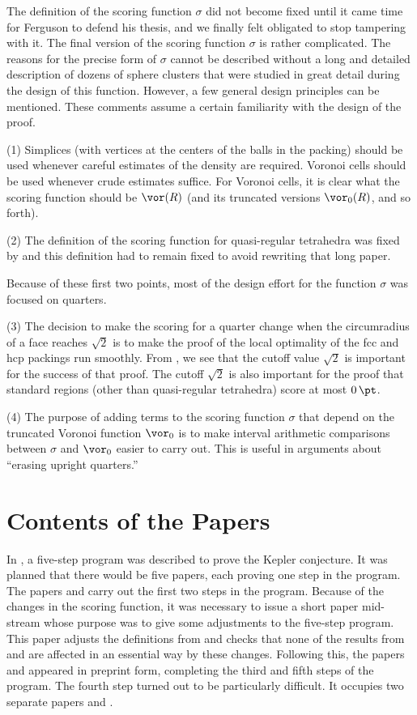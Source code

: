 The definition of the scoring function $\sigma$ did not become
fixed until it came time for Ferguson to defend his thesis, and we
finally felt obligated to stop tampering with it.  The final
version of the scoring function $\sigma$ is rather complicated.
The reasons for the precise form of $\sigma$ cannot be described
without a long and detailed description of dozens of sphere
clusters that were studied in great detail during the design of
this function. However, a few general design principles can be
mentioned.  These comments assume a certain familiarity with the
design of the proof.


(1) Simplices (with vertices at the centers of the balls in the
packing) should be used whenever careful estimates of the density
are required.  Voronoi cells should be used whenever crude
estimates suffice.  For Voronoi cells, it is clear what the
scoring function should be $\vor(R)$ (and its truncated versions
$\vor_0(R)$, and so forth).


(2) The definition of the scoring function for quasi-regular
tetrahedra was fixed by \cite{part1} and this definition had to
remain fixed to avoid rewriting that long paper.

Because of these first two points, most of the design effort for
the function $\sigma$ was focused on quarters.

(3)  The decision to make the scoring for a quarter change when
the circumradius of a face reaches $\sqrt2$ is to make the proof
of the local optimality of the fcc and hcp packings run smoothly.
From \cite{part2}, we see that the cutoff value $\sqrt2$ is
important for the success of that proof.  The cutoff $\sqrt2$ is
also important for the proof that standard regions (other than
quasi-regular tetrahedra) score at most $0\,\pt$.

(4) The purpose of adding terms to the scoring function $\sigma$
that depend on the truncated Voronoi function $\vor_0$ is to make
interval arithmetic comparisons between $\sigma$ and $\vor_0$
easier to carry out.  This is useful in arguments about ``erasing
upright quarters.''

\section{Contents of the Papers}

In \cite{part1}, a five-step program was described to prove the
Kepler conjecture.  It was planned that there would be five
papers, each proving one step in the program.  The papers
\cite{part1} and \cite{part2} carry out the first two steps in the
program. Because of the changes in the scoring function, it was
necessary to issue a short paper \cite{Form} mid-stream whose
purpose was to give some adjustments to the five-step program.
This paper adjusts the definitions from \cite{part1} and checks
that none of the results from \cite{part1} and \cite{part2} are
affected in an essential way by these changes. Following this, the
papers \cite{Hal98B} and \cite{Fer97} appeared in preprint form,
completing the third and fifth steps of the program. The fourth
step turned out to be particularly difficult. It occupies two
separate papers \cite{Hal98C} and \cite{Hal98D}.

